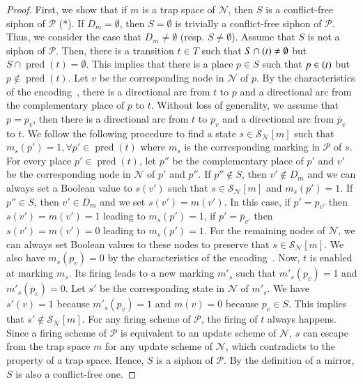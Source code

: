 \documentclass[preprint,12pt]{elsarticle}
\DeclareMathOperator{\pred}{pred}
\let\succ\relax
\DeclareMathOperator{\succ}{succ}
\begin{document}
\begin{proof}

  First, we show that if \(m\) is a trap space of \(\mathcal{N}\), then \(S\) is a conflict-free siphon of \(\mathcal{P}\) (*).
  If \(D_m = \emptyset\), then \(S = \emptyset\) is trivially a conflict-free siphon of \(\mathcal{P}\).
  Thus, we consider the case that \(D_m \neq \emptyset\) (resp. \(S \neq \emptyset\)).
  Assume that \(S\) is not a siphon of \(\mathcal{P}\).
  Then, there is a transition \(t \in T\) such that \(S \cap \succ(t) \neq \emptyset\) but \(S \cap \pred(t) = \emptyset\).
  This implies that there is a place \(p \in S\) such that \(p \in \succ(t)\) but \(p \not \in \pred(t)\).
  Let \(v\) be the corresponding node in \(\mathcal{N}\) of \(p\).
  By the characteristics of the encoding~\cite{chaouiya2004qualitative}, there is a directional arc from \(t\) to \(p\) and a directional arc from the complementary place of \(p\) to \(t\).
  Without loss of generality, we assume that \(p = p_v\), then there is a directional arc from \(t\) to \(p_v\) and a directional arc from \(\overline{p}_v\) to \(t\).
  We follow the following procedure to find a state \(s \in \mathcal{S}_{\mathcal{N}}[m]\) such that \(m_s(p') = 1, \forall p' \in \pred(t)\) where \(m_s\) is the corresponding marking in \(\mathcal{P}\) of \(s\).
  For every place \(p' \in \pred(t)\), let \(p''\) be the complementary place of \(p'\) and \(v'\) be the corresponding node in \(\mathcal{N}\) of \(p'\) and \(p''\).
  If \(p'' \not \in S\), then \(v' \not \in D_m\) and we can always set a Boolean value to \(s(v')\) such that \(s \in \mathcal{S}_{\mathcal{N}}[m]\) and \(m_s(p') = 1\).
  If \(p'' \in S\), then \(v' \in D_m\) and we set \(s(v') = m(v')\).
  In this case, if \(p' = p_{v'}\) then \(s(v') = m(v') = 1\) leading to \(m_s(p') = 1\), if \(p' = \overline{p}_{v'}\) then \(s(v') = m(v') = 0\) leading to \(m_s(p') = 1\).
  For the remaining nodes of \(\mathcal{N}\), we can always set Boolean values to these nodes to preserve that \(s \in \mathcal{S}_{\mathcal{N}}[m]\).
  We also have \(m_s(p_v) = 0\) by the characteristics of the encoding~\cite{chaouiya2004qualitative}.
  Now, \(t\) is enabled at marking \(m_s\).
  Its firing leads to a new marking \(m'_s\) such that \(m'_s(p_v) = 1\) and \(m'_s(\overline{p}_v) = 0\).
  Let \(s'\) be the corresponding state in \(\mathcal{N}\) of \(m'_s\).
  We have \(s'(v) = 1\) because \(m'_s(p_v) = 1\) and \(m(v) = 0\) because \(p_v \in S\).
  This implies that \(s' \not \in \mathcal{S}_{\mathcal{N}}[m]\).
  For any firing scheme of \(\mathcal{P}\), the firing of \(t\) always happens.
  Since a firing scheme of \(\mathcal{P}\) is equivalent to an update scheme of \(\mathcal{N}\), \(s\) can escape from the trap space \(m\) for any update scheme of \(\mathcal{N}\), which contradicts to the property of a trap space.
  Hence, \(S\) is a siphon of \(\mathcal{P}\).
  By the definition of a mirror, \(S\) is also a conflict-free one.


\end{proof}
\end{document}
